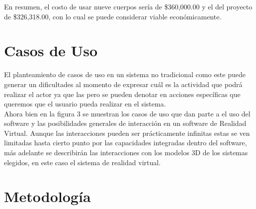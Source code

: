 En resumen, el costo de usar nueve cuerpos sería de \$360,000.00 y el del proyecto de \$326,318.00, con lo cual se puede considerar viable económicamente.\\

\section{Casos de Uso}
El planteamiento de casos de uso en un sistema no tradicional como este puede generar un dificultades al momento de expresar cuál es la actividad que podrá 
realizar el actor ya que las  pero se pueden denotar en acciones específicas que queremos que el usuario pueda realizar en el sistema.\\
Ahora bien en la figura 3 se muestran los casos de uso que dan parte a el uso del software y las posibilidades generales de interacción en un software de 
Realidad Virtual. Aunque las interacciones pueden ser prácticamente infinitas estas se ven limitadas hasta cierto punto por las capacidades integradas dentro 
del software, más adelante se describirán las interacciones con los modelos 3D de los sistemas elegidos, en este caso el sistema de realidad virtual.

\section{Metodología}

